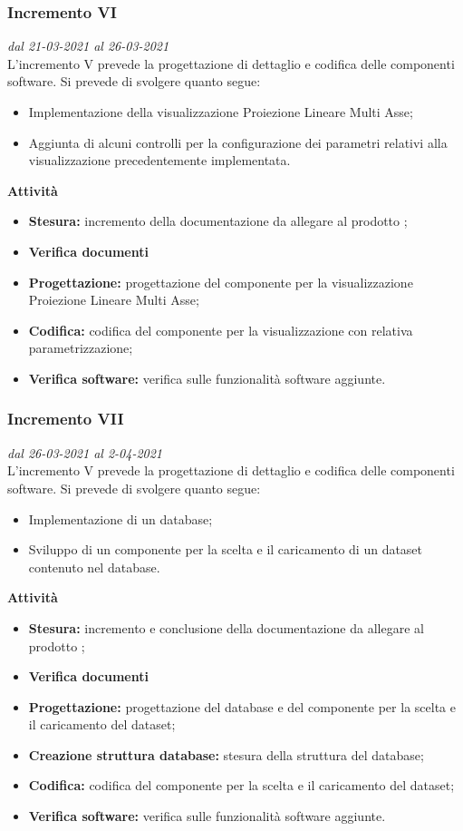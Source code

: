 \subsubsection{Incremento VI}
\textit{dal 21-03-2021 al 26-03-2021}\\
L'incremento V prevede la progettazione di dettaglio e codifica delle componenti software. Si prevede di svolgere quanto segue:
\begin{itemize}
\item Implementazione della visualizzazione Proiezione Lineare Multi Asse;
\item Aggiunta di alcuni controlli per la configurazione dei parametri relativi alla visualizzazione precedentemente implementata.
\end{itemize}
\textbf{Attività}
\begin{itemize}
\item \textbf{Stesura:} incremento della documentazione da allegare al prodotto ;
\item \textbf{Verifica documenti}
\item \textbf{Progettazione:} progettazione del componente per la visualizzazione Proiezione Lineare Multi Asse;
\item \textbf{Codifica:} codifica del componente per la visualizzazione con relativa parametrizzazione;
\item \textbf{Verifica software:} verifica sulle funzionalità software aggiunte.
\end{itemize}

\subsubsection{Incremento VII}
\textit{dal 26-03-2021 al 2-04-2021}\\
L'incremento V prevede la progettazione di dettaglio e codifica delle componenti software. Si prevede di svolgere quanto segue:
\begin{itemize}
\item Implementazione di un database;
\item Sviluppo di un componente per la scelta e il caricamento di un dataset contenuto nel database.
\end{itemize}
\textbf{Attività}
\begin{itemize}
\item \textbf{Stesura:} incremento e conclusione della documentazione da allegare al prodotto ;
\item \textbf{Verifica documenti}
\item \textbf{Progettazione:} progettazione del database e del componente per la scelta e il caricamento del dataset;
\item \textbf{Creazione struttura database:} stesura della struttura del database;
\item \textbf{Codifica:} codifica del componente per la scelta e il caricamento del dataset;
\item \textbf{Verifica software:} verifica sulle funzionalità software aggiunte.
\end{itemize}


